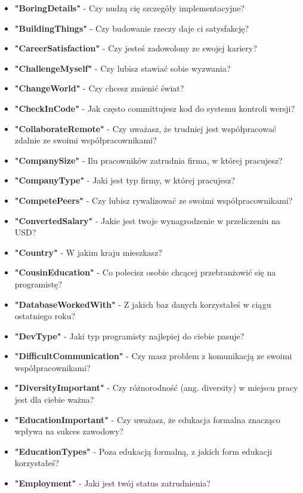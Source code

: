 \begin{appendices}
\begin{itemize}
        \item \textbf{"BoringDetails"} - Czy nudzą cię szczegóły implementacyjne?
        \item \textbf{"BuildingThings"} - Czy budowanie rzeczy daje ci satysfakcję?
        \item \textbf{"CareerSatisfaction"} - Czy jesteś zadowolony ze swojej kariery?
        \item \textbf{"ChallengeMyself"} - Czy lubisz stawiać sobie wyzwania?
        \item \textbf{"ChangeWorld"} - Czy chcesz zmienić świat?
        \item \textbf{"CheckInCode"} - Jak często committujesz kod do systemu kontroli wersji?
        \item \textbf{"CollaborateRemote"} - Czy uważasz, że trudniej jest współpracować zdalnie ze swoimi współpracownikami?
        \item \textbf{"CompanySize"} - Ilu pracowników zatrudnia firma, w której pracujesz?
        \item \textbf{"CompanyType"} - Jaki jest typ firmy, w której pracujesz?
        \item \textbf{"CompetePeers"} - Czy lubisz rywalizować ze swoimi współpracownikami?
        \item \textbf{"ConvertedSalary"} - Jakie jest twoje wynagrodzenie w przeliczeniu na USD?
        \item \textbf{"Country"} - W jakim kraju mieszkasz?
        \item \textbf{"CousinEducation"} - Co polecisz osobie chcącej przebranżowić się na programistę?
        \item \textbf{"DatabaseWorkedWith"} - Z jakich baz danych korzystałeś w ciągu ostatniego roku?
        \item \textbf{"DevType"} - Jaki typ programisty najlepiej do ciebie pasuje?
        \item \textbf{"DifficultCommunication"} - Czy masz problem z komunikacją ze swoimi współpracownikami?
        \item \textbf{"DiversityImportant"} - Czy różnorodność (ang. diversity) w miejscu pracy jest dla ciebie ważna?
        \item \textbf{"EducationImportant"} - Czy uważasz, że edukacja formalna znacząco wpływa na sukces zawodowy?
        \item \textbf{"EducationTypes"} - Poza edukacją formalną, z jakich form edukacji korzystałeś?
        \item \textbf{"Employment"} - Jaki jest twój status zatrudnienia?

\end{itemize}
\end{appendices}

